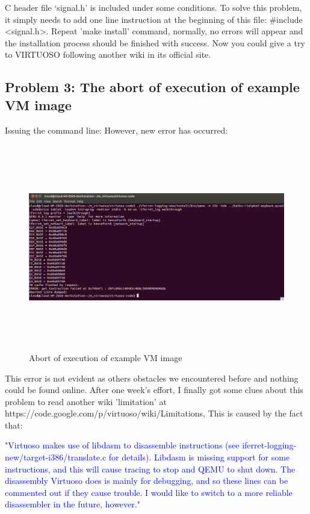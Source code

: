C header file ‘signal.h’ is included under some conditions. To solve this problem, it simply needs to  add one line instruction at the 
beginning of this file: \#include <signal.h>. Repeat 'make install' command, normally, no errors will appear and the installation process 
should be finished with success. Now you could give a try to VIRTUOSO following another wiki in its official site.

\subsection{Problem 3: The abort of execution of example VM image}
Issuing the command line:
However, new error has occurred:

\begin{figure}[htbp]
	\centering
		\includegraphics[width=14cm, height= 9cm ]{Figures/Figure35.png}
	\caption[Abort of execution of example VM image]{Abort of execution of example VM image}
	\label{fig:Abort of execution of example VM image}
\end{figure}

This error is not evident as others obstacles we encountered before and nothing could be found online. After one week’s effort, 
I finally got some clues about this problem to read another wiki 'limitation' at https://code.google.com/p/virtuoso/wiki/Limitations,
This is caused by the fact that:

\textcolor{blue}{
  "Virtuoso makes use of libdasm to disassemble instructions (see iferret-logging-new/target-i386/translate.c for details). 
  Libdasm is missing support for some instructions, and this will cause tracing to stop and QEMU to shut down. The disassembly Virtuoso does 
  is mainly for debugging, and so these lines can be commented out if they cause trouble. I would like to switch to a more reliable disassembler 
  in the future, however."
}

